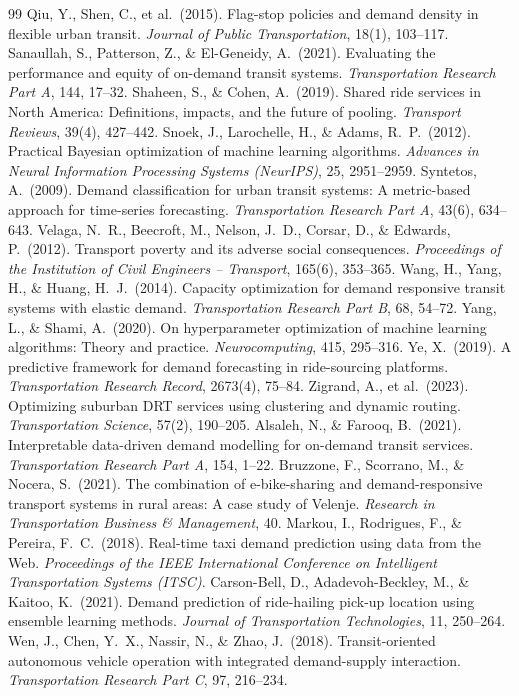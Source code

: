 \documentclass[12pt]{article}
\begin{document}
\begin{thebibliography}{99}
 Qiu, Y., Shen, C., et al.\ (2015). Flag-stop policies and demand density in flexible urban transit. \textit{Journal of Public Transportation}, 18(1), 103--117.
 Sanaullah, S., Patterson, Z., \& El-Geneidy, A.\ (2021). Evaluating the performance and equity of on-demand transit systems. \textit{Transportation Research Part A}, 144, 17--32.
 Shaheen, S., \& Cohen, A.\ (2019). Shared ride services in North America: Definitions, impacts, and the future of pooling. \textit{Transport Reviews}, 39(4), 427--442.
 Snoek, J., Larochelle, H., \& Adams, R.\ P.\ (2012). Practical Bayesian optimization of machine learning algorithms. \textit{Advances in Neural Information Processing Systems (NeurIPS)}, 25, 2951--2959.
 Syntetos, A.\ (2009). Demand classification for urban transit systems: A metric-based approach for time-series forecasting. \textit{Transportation Research Part A}, 43(6), 634--643.
 Velaga, N.\ R., Beecroft, M., Nelson, J.\ D., Corsar, D., \& Edwards, P.\ (2012). Transport poverty and its adverse social consequences. \textit{Proceedings of the Institution of Civil Engineers -- Transport}, 165(6), 353--365.
 Wang, H., Yang, H., \& Huang, H.\ J.\ (2014). Capacity optimization for demand responsive transit systems with elastic demand. \textit{Transportation Research Part B}, 68, 54--72.
 Yang, L., \& Shami, A.\ (2020). On hyperparameter optimization of machine learning algorithms: Theory and practice. \textit{Neurocomputing}, 415, 295--316.
 Ye, X.\ (2019). A predictive framework for demand forecasting in ride-sourcing platforms. \textit{Transportation Research Record}, 2673(4), 75--84.
 Zigrand, A., et al.\ (2023). Optimizing suburban DRT services using clustering and dynamic routing. \textit{Transportation Science}, 57(2), 190--205.
 Alsaleh, N., \& Farooq, B.\ (2021). Interpretable data-driven demand modelling for on-demand transit services. \textit{Transportation Research Part A}, 154, 1--22.
 Bruzzone, F., Scorrano, M., \& Nocera, S.\ (2021). The combination of e-bike-sharing and demand-responsive transport systems in rural areas: A case study of Velenje. \textit{Research in Transportation Business \& Management}, 40.
 Markou, I., Rodrigues, F., \& Pereira, F.\ C.\ (2018). Real-time taxi demand prediction using data from the Web. \textit{Proceedings of the IEEE International Conference on Intelligent Transportation Systems (ITSC)}.
 Carson-Bell, D., Adadevoh-Beckley, M., \& Kaitoo, K.\ (2021). Demand prediction of ride-hailing pick-up location using ensemble learning methods. \textit{Journal of Transportation Technologies}, 11, 250--264.
 Wen, J., Chen, Y.\ X., Nassir, N., \& Zhao, J.\ (2018). Transit-oriented autonomous vehicle operation with integrated demand-supply interaction. \textit{Transportation Research Part C}, 97, 216--234.

\end{thebibliography}
\end{document}
